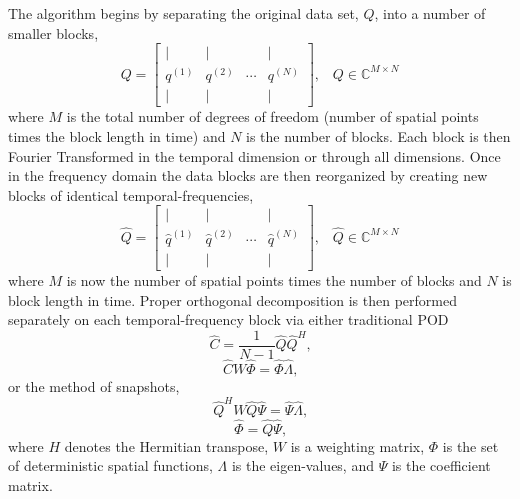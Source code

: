The algorithm begins by separating the original data set, $Q$, into a number of smaller blocks,
\begin{equation}
  Q = \left[
  \begin{matrix}
    \mid & \mid & & \mid \\
    q^{(1)} & q^{(2)} & \cdots & q^{(N)} \\
    \mid & \mid & & \mid
  \end{matrix}
  \right]\textrm{,}\quad Q\in\mathbb{C}^{M\times N}
  \label{eqn:07_data_block}
\end{equation}
where $M$ is the total number of degrees of freedom (number of spatial points times the block length in time) and $N$ is the number of blocks.
Each block is then Fourier Transformed in the temporal dimension or through all dimensions.
Once in the frequency domain the data blocks are then reorganized by creating new blocks of identical temporal-frequencies,
\begin{equation}
  \hat{Q} = \left[
  \begin{matrix}
    \mid & \mid & & \mid \\
    \hat{q}^{(1)} & \hat{q}^{(2)} & \cdots & \hat{q}^{(N)} \\
    \mid & \mid & & \mid
  \end{matrix}
  \right]\textrm{,}\quad \hat{Q}\in\mathbb{C}^{M\times N}
  \label{eqn:07_frequency_block}
\end{equation}
where $M$ is now the number of spatial points times the number of blocks and $N$ is block length in time.
Proper orthogonal decomposition is then performed separately on each temporal-frequency block via either traditional POD
\begin{equation}
  \hat{C} = \frac{1}{N-1}\hat{Q}\hat{Q}^H \textrm{,}
  \label{eqn:07_pod_01}
\end{equation}
\begin{equation}
  \hat{C}W\hat{\Phi}=\hat{\Phi}\hat{\Lambda} \textrm{,}
  \label{eqn:07_pod_02}
\end{equation}
or the method of snapshots,
\begin{equation}
  \hat{Q}^HW\hat{Q}\hat{\Psi}=\hat{\Psi}\hat{\Lambda} \textrm{,}
  \label{eqn:07_pod_03}
\end{equation}
\begin{equation}
  \hat{\Phi}=\hat{Q}\hat{\Psi} \textrm{,}
  \label{eqn:07_pod_04}
\end{equation}
where $H$ denotes the Hermitian transpose, $W$ is a weighting matrix, $\Phi$ is the set of deterministic spatial functions, $\Lambda$ is the eigen-values, and $\Psi$ is the coefficient matrix.

